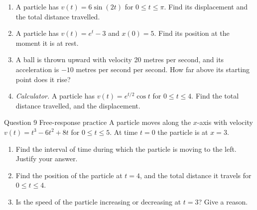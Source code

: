 \documentclass[11pt]{article}
\begin{document}
\begin{enumerate}[leftmargin=*,itemsep=2pt,start=5]
  \item A particle has $v(t)=6\sin(2t)$ for $0\le t\le\pi$. Find its displacement and the total distance travelled.\work{2.8cm}
  \item A particle has $v(t)=e^{t}-3$ and $x(0)=5$. Find its position at the moment it is at rest.\work{2.8cm}
  \item A ball is thrown upward with velocity 20 metres per second, and its acceleration is $-10$ metres per second per second. How far above its starting point does it rise?\work{2.8cm}
  \item \emph{Calculator.} A particle has $v(t)=e^{t/2}\cos t$ for $0\le t\le4$. Find the total distance travelled, and the displacement.\work{2.8cm}
\end{enumerate}

\begin{frbox}{Question 9 \textperiodcentered{} Free-response practice}
A particle moves along the $x$-axis with velocity $v(t)=t^3-6t^2+8t$ for $0\le t\le5$. At time $t=0$ the particle is at $x=3$.
\begin{enumerate}[label=(\alph*),leftmargin=*,itemsep=2pt]
  \item Find the interval of time during which the particle is moving to the left. Justify your answer.\work{2.6cm}
  \item Find the position of the particle at $t=4$, and the total distance it travels for $0\le t\le4$.\work{2.6cm}
  \item Is the speed of the particle increasing or decreasing at $t=3$? Give a reason.\work{2.6cm}
\end{enumerate}
\end{frbox}
\end{document}
